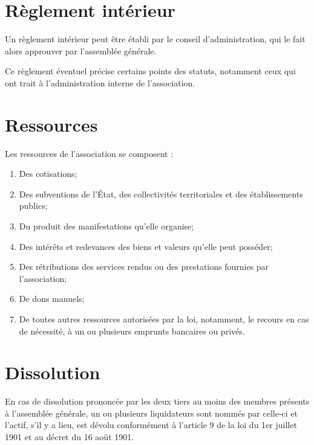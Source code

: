 \documentclass[12pt]{constitution}
\begin{document}
\section{Règlement intérieur}
Un règlement intérieur peut être établi par le conseil d’administration, qui le fait alors approuver par l’assemblée générale.

Ce règlement éventuel précise certains points des statuts, notamment ceux qui ont trait à l’administration interne de l’association.

\setcounter{section}{12}

\section{Ressources}
Les ressources de l’association se composent :
\begin{enumerate}
	\item Des cotisations;
	\item Des subventions de l’État, des collectivités territoriales et des établissements publics;
	\item Du produit des manifestations qu’elle organise;
	\item Des intérêts et redevances des biens et valeurs qu’elle peut posséder;
	\item Des rétributions des services rendus ou des prestations fournies par l'association;
	\item De dons manuels;
	\item De toutes autres ressources autorisées par la loi, notamment, le recours en cas de
	nécessité, à un ou plusieurs emprunts bancaires ou privés.
\end{enumerate}

\setcounter{section}{13}

\section{Dissolution}
En cas de dissolution prononcée par les deux tiers au moins des membres présents à l’assemblée générale, un ou plusieurs liquidateurs sont nommés par celle-ci et l’actif, s’il y a lieu, est dévolu conformément à l’article 9 de la loi du 1er juillet 1901 et au décret du 16 août 1901.
\end{document}
